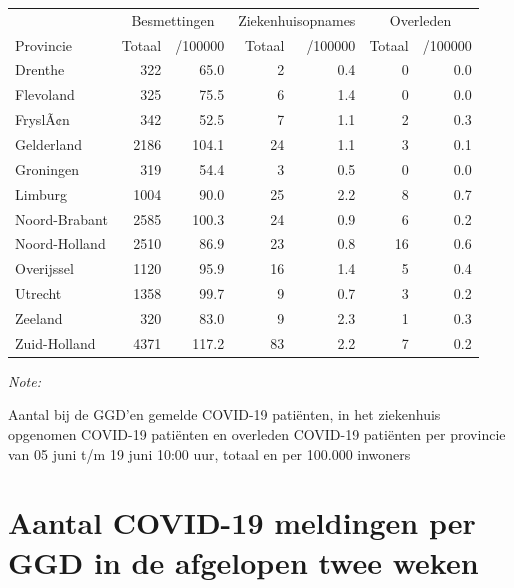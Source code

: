 \documentclass[
  english,
  man,floatsintext]{apa6}
\begin{document}
\begin{table}
\centering
\begin{threeparttable}
\begin{tabular}{lrrrrrr}
\toprule
\multicolumn{1}{c}{ } & \multicolumn{2}{c}{Besmettingen} & \multicolumn{2}{c}{Ziekenhuisopnames} & \multicolumn{2}{c}{Overleden} \\
\cmidrule(l{3pt}r{3pt}){2-3} \cmidrule(l{3pt}r{3pt}){4-5} \cmidrule(l{3pt}r{3pt}){6-7}
Provincie & Totaal & /100000 & Totaal & /100000 & Totaal & /100000\\
\midrule
Drenthe & 322 & 65.0 & 2 & 0.4 & 0 & 0.0\\
Flevoland & 325 & 75.5 & 6 & 1.4 & 0 & 0.0\\
FryslÃ¢n & 342 & 52.5 & 7 & 1.1 & 2 & 0.3\\
Gelderland & 2186 & 104.1 & 24 & 1.1 & 3 & 0.1\\
Groningen & 319 & 54.4 & 3 & 0.5 & 0 & 0.0\\
Limburg & 1004 & 90.0 & 25 & 2.2 & 8 & 0.7\\
Noord-Brabant & 2585 & 100.3 & 24 & 0.9 & 6 & 0.2\\
Noord-Holland & 2510 & 86.9 & 23 & 0.8 & 16 & 0.6\\
Overijssel & 1120 & 95.9 & 16 & 1.4 & 5 & 0.4\\
Utrecht & 1358 & 99.7 & 9 & 0.7 & 3 & 0.2\\
Zeeland & 320 & 83.0 & 9 & 2.3 & 1 & 0.3\\
Zuid-Holland & 4371 & 117.2 & 83 & 2.2 & 7 & 0.2\\
\bottomrule
\end{tabular}
\begin{tablenotes}
\item \textit{Note: } 
\item Aantal bij de GGD’en gemelde COVID-19 patiënten, in het ziekenhuis opgenomen COVID-19 patiënten en overleden COVID-19 patiënten per provincie van 05 juni t/m 19 juni 10:00 uur, totaal en per 100.000 inwoners
\end{tablenotes}
\end{threeparttable}
\end{table}

\newpage

\hypertarget{aantal-covid-19-meldingen-per-ggd-in-de-afgelopen-twee-weken}{%
\section{Aantal COVID-19 meldingen per GGD in de afgelopen twee weken}\label{aantal-covid-19-meldingen-per-ggd-in-de-afgelopen-twee-weken}}
\end{document}
